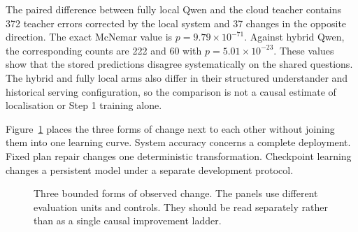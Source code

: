 \documentclass{article}
\begin{document}
The paired difference between fully local Qwen and the cloud teacher contains 372 teacher errors
corrected by the local system and 37 changes in the opposite direction.  The exact McNemar value is
$p=9.79\times10^{-71}$.  Against hybrid Qwen, the corresponding counts are 222 and 60 with
$p=5.01\times10^{-23}$.  These values show that the stored predictions disagree systematically on
the shared questions.  The hybrid and fully local arms also differ in their structured
understander and historical serving configuration, so the comparison is not a causal estimate of
localisation or Step 1 training alone.

Figure~\ref{fig:three-evidence} places the three forms of change next to each other without joining
them into one learning curve.  System accuracy concerns a complete deployment.  Fixed plan repair
changes one deterministic transformation.  Checkpoint learning changes a persistent model under a
separate development protocol.

\begin{figure}[t]
\centering
\setlength{\fboxsep}{7pt}
\hfill
{}
\hfill
{}
\caption{Three bounded forms of observed change.  The panels use different evaluation units and
controls.  They should be read separately rather than as a single causal improvement ladder.}
\label{fig:three-evidence}
\end{figure}
\end{document}
